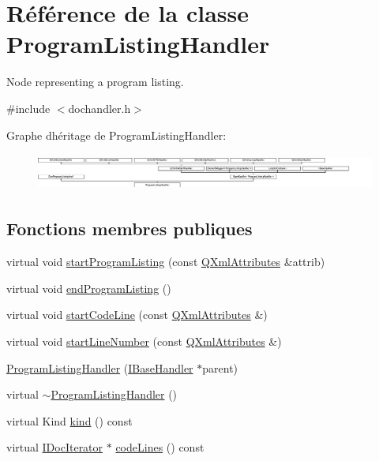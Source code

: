 \hypertarget{class_program_listing_handler}{}\section{Référence de la classe Program\+Listing\+Handler}
\label{class_program_listing_handler}


Node representing a program listing.  




{\ttfamily \#include $<$dochandler.\+h$>$}

Graphe d\textquotesingle{}héritage de Program\+Listing\+Handler\+:\begin{figure}[H]
\begin{center}
\leavevmode
\includegraphics[height=1.226054cm]{class_program_listing_handler}
\end{center}
\end{figure}
\subsection*{Fonctions membres publiques}
\begin{DoxyCompactItemize}
\item 
virtual void \hyperlink{class_program_listing_handler_a4c96dca5aceac76276d2e15b7c5af580}{start\+Program\+Listing} (const \hyperlink{class_q_xml_attributes}{Q\+Xml\+Attributes} \&attrib)
\item 
virtual void \hyperlink{class_program_listing_handler_afdcff06eb006234d68208b9cb61b799d}{end\+Program\+Listing} ()
\item 
virtual void \hyperlink{class_program_listing_handler_a4c24929ffe2f16801d54ed89d4fb05d9}{start\+Code\+Line} (const \hyperlink{class_q_xml_attributes}{Q\+Xml\+Attributes} \&)
\item 
virtual void \hyperlink{class_program_listing_handler_a42c9deeaa970dfd34714051e635c24fd}{start\+Line\+Number} (const \hyperlink{class_q_xml_attributes}{Q\+Xml\+Attributes} \&)
\item 
\hyperlink{class_program_listing_handler_a81f2a8687aa792d7d063f6d2779e4137}{Program\+Listing\+Handler} (\hyperlink{class_i_base_handler}{I\+Base\+Handler} $\ast$parent)
\item 
virtual \hyperlink{class_program_listing_handler_a0f7ac7e061ce3c52fabe186b0edf7485}{$\sim$\+Program\+Listing\+Handler} ()
\item 
virtual Kind \hyperlink{class_program_listing_handler_a7913df273c27d9a570cbd1f06f8d45e5}{kind} () const 
\item 
virtual \hyperlink{class_i_doc_iterator}{I\+Doc\+Iterator} $\ast$ \hyperlink{class_program_listing_handler_a7bef55ca0410900ca1b798bda8ed9786}{code\+Lines} () const 
\end{DoxyCompactItemize}
